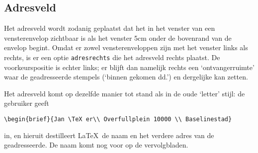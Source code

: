\subsection{Adresveld}                                                          
                                                                                
Het adresveld wordt zodanig geplaatst dat het in het                            
venster van een vensterenvelop zichtbaar is als het                             
venster 5cm onder de bovenrand van de envelop begint.                           
Omdat er zowel vensterenveloppen zijn met het venster                           
links als rechts, is er een optie {\tt adresrechts}                             
die het adresveld rechts plaatst. De voorkeurspositie                           
is echter links; er blijft dan namelijk rechts een                              
`ontvangerruimte' waar de geadresseerde stempels (`binnen                       
gekomen dd.') en dergelijke kan zetten.                                         
                                                                                
Het adresveld komt op dezelfde manier tot stand als in de                       
oude `letter' stijl: de gebruiker geeft                                         
\begin{verbatim}                                                                
\begin{brief}{Jan \TeX er\\ Overfullplein 10000 \\ Baselinestad}                
\end{verbatim}                                                                  
in, en hieruit destilleert \LaTeX\ de naam en het verdere                       
adres van de geadresseerde.                                                     
De naam komt nog voor op de vervolgbladen.                                      
                                                                                
